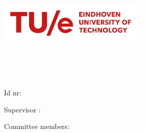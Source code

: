
\begin{titlepage}
    \begin{center}
        \vspace{1.6cm}
        \includegraphics[height=2cm]{figures/TUe-logo-descriptor-line-scarlet-rgb}\\
        \vspace{1.6cm}

        \Large
        \department\\
        \group\\
        \vspace*{1cm}
        \Huge
        \textbf{\doctitle}
        \vspace{0.5cm}

        \LARGE
        \docsubtitle
        \vspace{1.5cm}

        \large
        \textbf{\me}\\
        \vspace{0.4cm}
        Id nr: \studentNumber \\
        \texttt{\email}
        \vfill


        Supervisor : \firstCommitteeMember\\

        \vfill

        Committee members:\\
        \firstCommitteeMember\\
        \secondCommitteeMember\\
        \thirdCommitteeMember\\
        \vfill
        \builddate \\

    \end{center}
\end{titlepage}